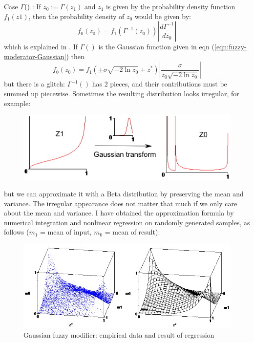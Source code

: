 Case $\Gamma$() : If $z_0 := \Gamma(z_1)$ and $z_1$ is given by the probability density function $f_1(z1)$, then the probability density of $z_0$ would be given by:
\begin{equation}
f_0(z_0) = f_1(\Gamma^{-1}(z_0)) \left | \frac{d\Gamma^{-1}}{dz_0} \right |
\end{equation}
which is explained in \citep*{Wikipedia2008}.  If $\Gamma()$ is the Gaussian function given in eqn (\ref{eqn:fuzzy-moderator-Gaussian}) then\\
$$ f_0(z_0) = f_1(\pm \sigma \sqrt{-2 \ln z_0} + z^*) \left | \frac{\sigma}{z_0 \sqrt{-2 \ln z_0}} \right | $$
but there is a glitch:  $\Gamma^{-1}()$ has 2 pieces, and their contributions must be summed up piecewise.  Sometimes the resulting distribution looks irregular, for example:
\begin{figure}[H]
\centering
\includegraphics[scale=0.9]{Z1-Gaussian-transform-to-Z0-ugly.png}
\end{figure}
but we can approximate it with a Beta distribution by preserving the mean and variance.  The irregular appearance does not matter that much if we only care about the mean and variance.  I have obtained the approximation formula by numerical integration and nonlinear regression on randomly generated samples, as follows ($m_1$ = mean of input, $m_0$ = mean of result):
\begin{figure}[H]
\centering
\includegraphics[scale=0.7]{Gaussian-fuzzy-modifier-regression-result.png}
\caption{Gaussian fuzzy modifier:  empirical data and result of regression}
\end{figure}


